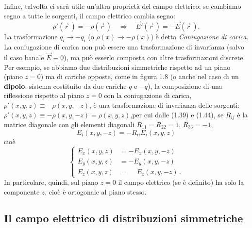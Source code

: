 Infine, talvolta ci sar\`a utile un'altra propriet\`a del campo elettrico: se
cambiamo segno a tutte le sorgenti, il campo elettrico cambia segno:
\begin{equation}
  \rho'(\vec r\,)=-\rho(\vec r\,)\quad\Rightarrow\quad\vec E'(\vec r\,)
  =-\vec E(\vec r\,).
  \tag{1.44}
\end{equation}
La trasformazione $q_i\to-q_i$ (o $\rho(x)\to-\rho(x)$) \`e detta
\emph{Coniugazione di carica}.\\
La coniugazione di carica non pu\`o essere una trasformazione di invarianza
(salvo il caso banale $\vec E\equiv0$), ma pu\`o esserlo composta con altre
trasformazioni discrete.\\
Per esempio, se abbiamo due distribuzioni simmetriche rispetto ad un piano
(piano $z=0$) ma di cariche opposte, come in figura 1.8 (o anche nel caso di un
\textbf{dipolo}: sistema costituito da due cariche $q$ e $-q$), la composizione
di una riflessione rispetto al piano $z=0$ con la coniugazione di carica,
$\rho'(x,y,z)\equiv-\rho(x,y,-z)$, \`e una trasformazione di invarianza delle
sorgenti:
$\rho'(x,y,z)\equiv-\rho(x,y,-z)=\rho(x,y,z)$,\quad per cui dalle (1.39) e
(1.44), se $R_{ij}$ \`e la matrice diagonale con gli elementi diagonali
$R_{11}=R_{22}=1$, $R_{33}=-1$,
\begin{equation}
  E_i(x,y,-z)=-R_{ii}E_i(x,y,z)
  \tag{1.45}
\end{equation}
cio\`e
\begin{equation}
  \left\{\begin{aligned}
    E_x(x,y,z)&=-E_x(x,y,-z)\\
    E_y(x,y,z)&=-E_y(x,y,-z)\\
    E_z(x,y,z)&=\phantom{-}E_z(x,y,-z)\,.
  \end{aligned}\right.
  \tag{1.46}
\end{equation}
In particolare, quindi, sul piano $z=0$ il campo elettrico (se \`e definito) ha
solo la componente $z$, cio\`e \`e ortogonale al piano stesso.

\subsection{Il campo elettrico di distribuzioni simmetriche}

